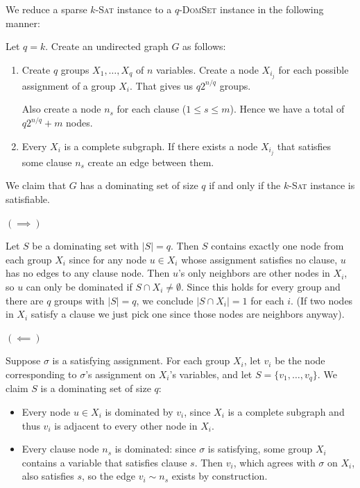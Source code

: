 \documentclass[12pt]{article}
\begin{document}
\begin{solution}
    \bbni

    We reduce a sparse $k$-\textsc{Sat} instance to a $q$-\textsc{DomSet} instance in the following manner: 

    Let $q = k$. Create an undirected graph $G$ as follows: 
    \begin{enumerate}
        \item Create $q$ groups $X_1, \ldots, X_q$ of $n$ variables. Create a node $X_{i_j}$ for each possible assignment of a group $X_i$. That gives us $q2^{n/q}$ groups. 
        
        Also create a node $n_s$ for each clause ($1 \leq s \leq m$).  
        Hence we have a total of $q2^{n/q} + m$ nodes. 

        \item Every $X_i$ is a complete subgraph. If there exists a node $X_{i_j}$ that satisfies some clause $n_s$ create an edge between them.
    \end{enumerate}


    We claim that $G$ has a dominating set of size $q$ if and only if the $k$-\textsc{Sat} instance is satisfiable.


    $(\implies)$ 
    
    Let $S$ be a dominating set with $|S| = q$. Then $S$ contains exactly one node from each group $X_i$ since for any node $u \in X_i$ whose assignment satisfies no clause, $u$ has no edges to any clause node. Then $u$'s only neighbors are other nodes in $X_i$, so $u$ can only be dominated if $S \cap X_i \neq \emptyset$. Since this holds for every group and there are $q$ groups with $|S| = q$, we conclude $|S \cap X_i| = 1$ for each $i$. (If two nodes in $X_i$ satisfy a clause we just pick one since those nodes are neighbors anyway). 


    $(\impliedby)$ 
    
    
    Suppose $\sigma$ is a satisfying assignment. For each group $X_i$, let $v_i$ be the node corresponding to $\sigma$'s assignment on $X_i$'s variables, and let $S = \{v_1, \ldots, v_q\}$. We claim $S$ is a dominating set of size $q$:
    \begin{itemize}
        \item Every node $u \in X_i$ is dominated by $v_i$, since $X_i$ is a complete subgraph and thus $v_i$ is adjacent to every other node in $X_i$.
        \item Every clause node $n_s$ is dominated: since $\sigma$ is satisfying, some group $X_i$ contains a variable that satisfies clause $s$. Then $v_i$, which agrees with $\sigma$ on $X_i$, also satisfies $s$, so the edge $v_i \sim n_s$ exists by construction.
    \end{itemize}
    


\end{solution}
\end{document}
